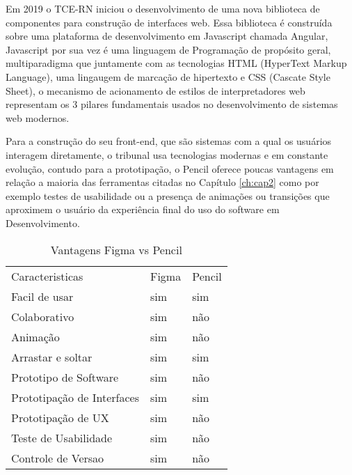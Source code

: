  Em 2019 o TCE-RN iniciou o desenvolvimento de uma nova biblioteca de componentes para construção de interfaces web. Essa biblioteca é construída sobre uma plataforma de desenvolvimento em Javascript chamada Angular, Javascript por sua vez é uma linguagem de Programação de propósito geral, multiparadigma que juntamente com as tecnologias HTML (HyperText Markup Language), uma lingaugem de marcação de hipertexto e CSS (Cascate Style Sheet), o mecanismo de acionamento de estilos de interpretadores web representam os 3 pilares fundamentais usados no desenvolvimento de sistemas web modernos.

  Para a construção do seu front-end, que são sistemas com a qual os usuários interagem diretamente, o tribunal usa tecnologias modernas e em constante evolução, contudo para a prototipação, o Pencil oferece poucas vantagens em relação a maioria das ferramentas citadas no Capítulo \ref{ch:cap2} como por exemplo testes de usabilidade ou a presença de animações ou transições que aproximem o usuário da experiência final do uso do software em Desenvolvimento.

  \begin{table*}[!ht]
    \centering
    \caption{Vantagens Figma vs Pencil}
    \begin{tabular}{lll}
      
      \rowcolor[HTML]{AAAAAA}
      Caracteristicas             &
      Figma                       &
      Pencil                      \\
      \rowcolor[HTML]{DDDDDD}
      Facil de usar               &
      sim                         &
      sim                         \\
      Colaborativo                &
      sim                         &
      não                         \\
      \rowcolor[HTML]{DDDDDD}
      Animação                    &
      sim                         &
      não                         \\
      Arrastar e soltar           &
      sim                         &
      sim                         \\
      \rowcolor[HTML]{DDDDDD}
      Prototipo de Software       &
      sim                         &
      não                         \\
      Prototipação de Interfaces  &
      sim                         &
      sim                         \\
      \rowcolor[HTML]{DDDDDD}
      Prototipação de UX          &
      sim                         &
      não                         \\
      Teste de Usabilidade        &
      sim                         &
      não                         \\
      \rowcolor[HTML]{DDDDDD}
      Controle de Versao          &
      sim                         &
      não                         \\
    \end{tabular}
    \label{table-figma_vs_pencil}
  \end{table*}

